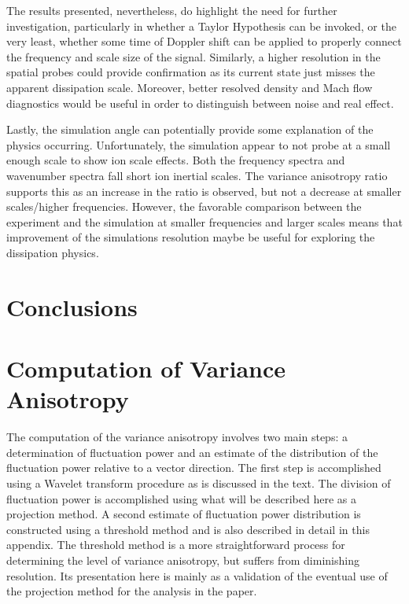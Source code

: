 \documentclass[aip,prl,amsmath,amssymb,reprint,superscriptaddress]{revtex4-1} %
\begin{document}
The results presented, nevertheless, do highlight the need for further investigation, particularly in whether a Taylor Hypothesis can be invoked, or the very least, whether some time of Doppler shift can be applied to properly connect the frequency and scale size of the signal. Similarly, a higher resolution in the spatial probes could provide confirmation as its current state just misses the apparent dissipation scale. Moreover, better resolved density and Mach flow diagnostics would be useful in order to distinguish between noise and real effect.

Lastly, the simulation angle can potentially provide some explanation of the physics occurring. Unfortunately, the simulation appear to not probe at a small enough scale to show ion scale effects. Both the frequency spectra and wavenumber spectra fall short ion inertial scales. The variance anisotropy ratio supports this as an increase in the ratio is observed, but not a decrease at smaller scales/higher frequencies. However, the favorable comparison between the experiment and the simulation at smaller frequencies and larger scales means that improvement of the simulations resolution maybe be useful for exploring the dissipation physics.

\section{Conclusions}



\appendix

\section{Computation of Variance Anisotropy}

The computation of the variance anisotropy involves two main steps: a determination of fluctuation power and an estimate of the distribution of the fluctuation power relative to a vector direction. The first step is accomplished using a Wavelet transform procedure as is discussed in the text. The division of fluctuation power is accomplished using what will be described here as a projection method. A second estimate of fluctuation power distribution is constructed using a threshold method and is also described in detail in this appendix. The threshold method is a more straightforward process for determining the level of variance anisotropy, but suffers from diminishing resolution. Its presentation here is mainly as a validation of the eventual use of the projection method for the analysis in the paper. 
\end{document}
